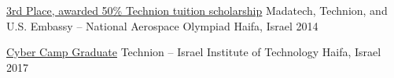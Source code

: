 



\begin{cvhonors}

  \cvhonor
    {\href{https://www.madatech.org.il/olimpiyeda-2014-final}{\underline{3rd Place, awarded 50\% Technion tuition scholarship}}} %
    {Madatech, Technion, and U.S. Embassy – National Aerospace Olympiad} %
    {Haifa, Israel} %
    {2014} %

  \cvhonor
    {\href{https://cont-edu.technion.ac.il/programs/cyber/cyber-camp-2/}{\underline{Cyber Camp Graduate}}} %
    {Technion – Israel Institute of Technology} %
    {Haifa, Israel} %
    {2017} %


\end{cvhonors}